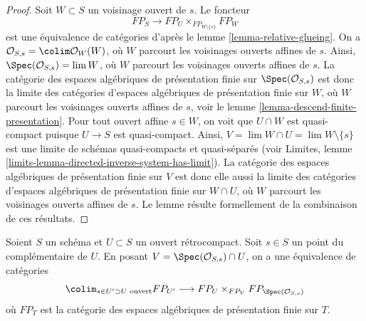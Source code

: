 \begin{proof}
Soit $W \subset S$ un voisinage ouvert de $s$. Le foncteur
$$
FP_S \to FP_U \times_{FP_{W \setminus \{s\}}} FP_W
$$
est une équivalence de catégories d'après le lemme \ref{lemma-relative-glueing}.
On a $\mathcal{O}_{S, s} = \colim \mathcal{O}_W(W)$, où
$W$ parcourt les voisinages ouverts affines de $s$.
Ainsi, $\Spec(\mathcal{O}_{S, s}) = \lim W$, où $W$
parcourt les voisinages ouverts affines de $s$.
La catégorie des espaces algébriques de présentation finie
sur $\Spec(\mathcal{O}_{S, s})$ est donc la limite des
catégories d'espaces algébriques de présentation finie sur
$W$, où $W$ parcourt les voisinages ouverts affines
de $s$, voir le
lemme \ref{lemma-descend-finite-presentation}.
Pour tout ouvert affine $s \in W$, on voit que $U \cap W$
est quasi-compact puisque $U \to S$ est quasi-compact.
Ainsi, $V = \lim W \cap U = \lim W \setminus \{s\}$ est une limite de
schémas quasi-compacts et quasi-séparés (voir
Limites, lemme \ref{limits-lemma-directed-inverse-system-has-limit}).
La catégorie des espaces algébriques de présentation finie
sur $V$ est donc elle aussi la limite des
catégories d'espaces algébriques de présentation finie sur
$W \cap U$, où $W$ parcourt les voisinages ouverts affines
de $s$. Le lemme résulte formellement de la combinaison
de ces résultats.
\end{proof}

\begin{lemma}
\label{lemma-glueing-near-point}
Soient $S$ un schéma et $U \subset S$ un ouvert rétrocompact.
Soit $s \in S$ un point du complémentaire de $U$. En posant
$V = \Spec(\mathcal{O}_{S, s}) \cap U$, on a
une équivalence de catégories
$$
\colim_{s \in U' \supset U\text{ ouvert}} FP_{U'}
\longrightarrow
FP_U \times_{FP_V} FP_{\Spec(\mathcal{O}_{S, s})}
$$
où $FP_T$ est la catégorie des espaces algébriques de présentation finie
sur $T$.
\end{lemma}


